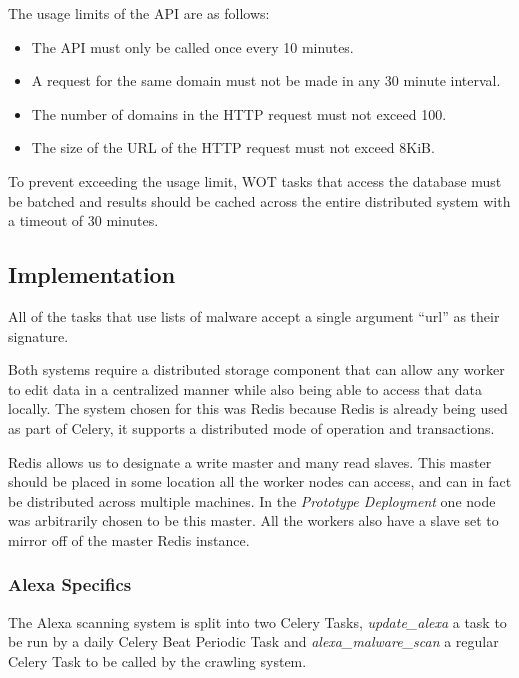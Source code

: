 The usage limits of the API are as follows\cite{wot-about}:

\begin{itemize}
    \item The API must only be called once every 10 minutes.
    \item A request for the same domain must not be made in any 30 minute interval.
    \item The number of domains in the HTTP request must not exceed 100.
    \item The size of the URL of the HTTP request must not exceed 8KiB.
\end{itemize}

To prevent exceeding the usage limit, WOT tasks that access the database must be batched and results should be cached across the entire distributed system with a timeout of 30 minutes.


\subsection{Implementation}
All of the tasks that use lists of malware accept a single argument ``url'' as their signature.

Both systems require a distributed storage component that can allow any worker to edit data in a centralized manner while also being able to access that data locally. The system chosen for this was Redis\cite{redis} because Redis is already being used as part of Celery, it supports a distributed mode of operation and transactions.

Redis allows us to designate a write master and many read slaves. This master should be placed in some location all the worker nodes can access, and can in fact be distributed across multiple machines.  In the \emph{Prototype Deployment} one node was arbitrarily chosen to be this master. All the workers also have a slave set to mirror off of the master Redis instance.

\subsubsection{Alexa Specifics}
The Alexa scanning system is split into two Celery Tasks, \emph{update_alexa} a task to be run by a daily Celery Beat Periodic Task and \emph{alexa_malware_scan} a regular Celery Task to be called by the crawling system.

